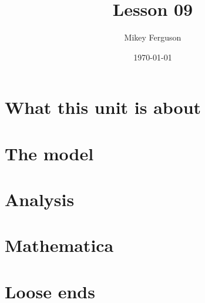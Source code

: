 \documentclass[11pt]{article}
\title{Lesson 09}
\author{Mikey Ferguson}
\date{\today}
\begin{document}
\maketitle
\tableofcontents
\bigskip

\section{What this unit is about}

\section{The model}

\section{Analysis}

\section{Mathematica}

\section{Loose ends}
\end{document}
